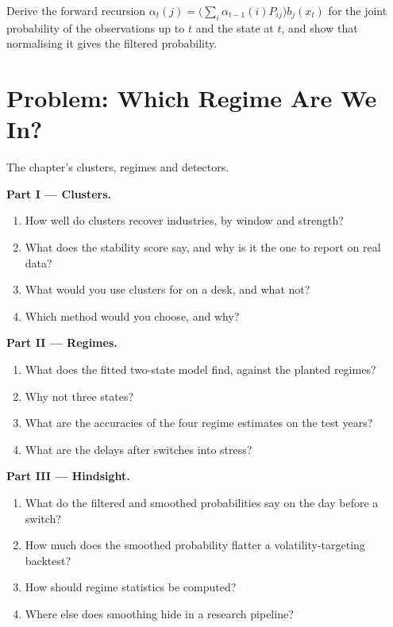\begin{exercise}[$\star\star\star$]\label{exo:ml:clustering-regimes-and-anomaly-detection:8}
Derive the forward recursion $\alpha_t(j) = \big(\sum_i\alpha_{t-1}(i)P_{ij}\big)b_j(x_t)$ for the joint probability of the
observations up to $t$ and the state at $t$, and show that normalising it gives the filtered probability.
\end{exercise}

\section{Problem: Which Regime Are We In?}

\begin{problem}\label{pb:ml:clustering-regimes-and-anomaly-detection:1}
The chapter's clusters, regimes and detectors.

\medskip\noindent\textbf{Part I --- Clusters.}
\begin{enumerate}
\item How well do clusters recover industries, by window and strength?
\item What does the stability score say, and why is it the one to report on real data?
\item What would you use clusters for on a desk, and what not?
\item Which  method would you choose, and why?
\end{enumerate}

\medskip\noindent\textbf{Part II --- Regimes.}
\begin{enumerate}[resume]
\item What does the fitted two-state model find, against the planted regimes?
\item Why not three states?
\item What are the accuracies of the four regime estimates on the test years?
\item What are the delays after switches into stress?
\end{enumerate}

\medskip\noindent\textbf{Part III --- Hindsight.}
\begin{enumerate}[resume]
\item What do the filtered and smoothed probabilities say on the day before a switch?
\item How much does the smoothed probability flatter a volatility-targeting backtest?
\item How should regime statistics be computed?
\item Where else does smoothing hide in a research pipeline?
\end{enumerate}


\end{problem}
